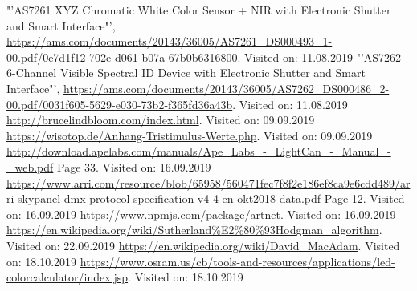 \documentclass[11pt]{scrartcl}
\begin{document}
\begin{thebibliography}{xxxxxxxxxxxxxxxxxxx}
    "'AS7261 XYZ Chromatic White Color Sensor + NIR with Electronic Shutter and Smart Interface"', \url{https://ams.com/documents/20143/36005/AS7261_DS000493_1-00.pdf/0e7d1f12-702e-d061-b07a-67b0b6316800}. Visited on: 11.08.2019
    "'AS7262 6-Channel Visible Spectral ID Device with Electronic Shutter and Smart Interface"', \url{https://ams.com/documents/20143/36005/AS7262_DS000486_2-00.pdf/0031f605-5629-e030-73b2-f365fd36a43b}. Visited on: 11.08.2019
     \url{http://brucelindbloom.com/index.html}. Visited on: 09.09.2019
     \url{https://wisotop.de/Anhang-Tristimulus-Werte.php}. Visited on: 09.09.2019
     \url{http://download.apelabs.com/manuals/Ape_Labs_-_LightCan_-_Manual_-_web.pdf} Page 33. Visited on: 16.09.2019
     \url{https://www.arri.com/resource/blob/65958/560471fec7f8f2e186ef8ca9e6cdd489/arri-skypanel-dmx-protocol-specification-v4-4-en-okt2018-data.pdf} Page 12. Visited on: 16.09.2019
     \url{https://www.npmjs.com/package/artnet}. Visited on: 16.09.2019
     \url{https://en.wikipedia.org/wiki/Sutherland%E2%80%93Hodgman_algorithm}. Visited on: 22.09.2019
     \url{https://en.wikipedia.org/wiki/David_MacAdam}. Visited on: 18.10.2019
     \url{https://www.osram.us/cb/tools-and-resources/applications/led-colorcalculator/index.jsp}. Visited on: 18.10.2019
\end{thebibliography}
\endgroup
\clearpage

\end{document}
